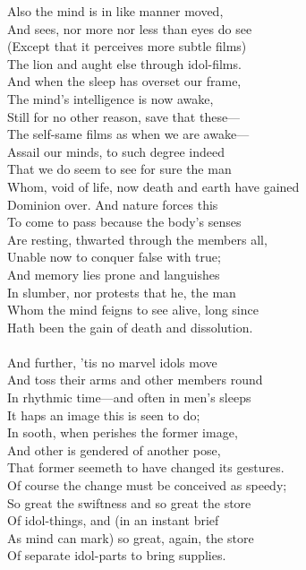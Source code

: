 Also the mind is in like manner moved,\\
And sees, nor more nor less than eyes do see\\
(Except that it perceives more subtle films)\\
The lion and aught else through idol-films.\\
And when the sleep has overset our frame,\\
The mind's intelligence is now awake,\\
Still for no other reason, save that these—\\
The self-same films as when we are awake—\\
Assail our minds, to such degree indeed\\
That we do seem to see for sure the man\\
Whom, void of life, now death and earth have gained\\
Dominion over. And nature forces this\\
To come to pass because the body's senses\\
Are resting, thwarted through the members all,\\
Unable now to conquer false with true;\\
And memory lies prone and languishes\\
In slumber, nor protests that he, the man\\
Whom the mind feigns to see alive, long since\\
Hath been the gain of death and dissolution.\\
\\
And further, 'tis no marvel idols move\\
And toss their arms and other members round\\
In rhythmic time—and often in men's sleeps\\
It haps an image this is seen to do;\\
In sooth, when perishes the former image,\\
And other is gendered of another pose,\\
That former seemeth to have changed its gestures.\\
Of course the change must be conceived as speedy;\\
So great the swiftness and so great the store\\
Of idol-things, and (in an instant brief\\
As mind can mark) so great, again, the store\\
Of separate idol-parts to bring supplies.\\

